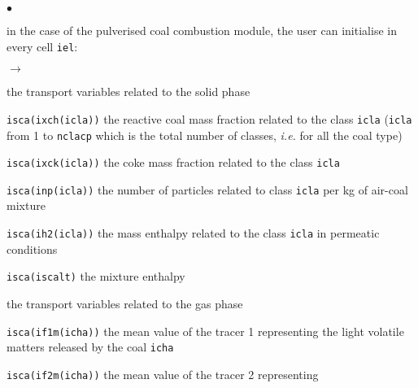 {{{\begin{list}{$\bullet$}{}
        \item in the case of the pulverised coal combustion module, the
             user can initialise in every cell \texttt{iel}:
              \begin{list}{$\rightarrow$}{}
                     \item the transport variables related to the solid phase
                           \begin{list}{}{}
                                  \item \texttt{isca(ixch(icla))}
                                  the reactive coal mass fraction related to the
                                  class \texttt{icla} (\texttt{icla} from 1 to
                                  \texttt{nclacp} which is the total number of
                                  classes, {\em i.e.} for all the coal type)
                                  \item \texttt{isca(ixck(icla))}
                                  the coke mass fraction related to the class
                                  \texttt{icla}
                                  \item \texttt{isca(inp(icla))} the
                                  number of particles related to class
                                  \texttt{icla} per kg of air-coal mixture
                                  \item \texttt{isca(ih2(icla))} the
                                   mass enthalpy related to the class
                                   \texttt{icla} in permeatic conditions
                           \end{list}
                     \item \texttt{isca(iscalt)} the mixture enthalpy
                     \item the transport variables related to the gas phase
                           \begin{list}{}{}
                                  \item
                                       \texttt{isca(if1m(icha))} the
                                       mean value of the tracer 1 representing
                                       the light volatile matters released by
                                       the coal \texttt{icha}
                                  \item
                                       \texttt{isca(if2m(icha))} the
                                        mean value of the tracer 2 representing

\end{list}
\end{list}
\end{list}}}}
